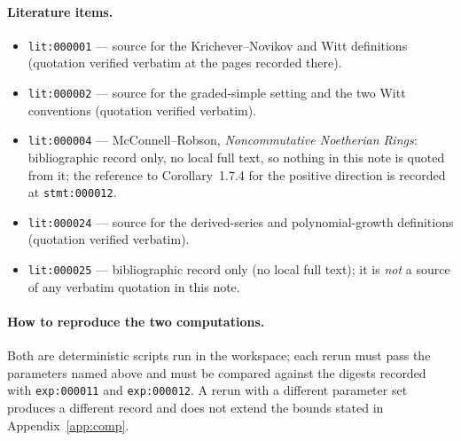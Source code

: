 \documentclass[11pt]{ctexart}
\theoremstyle{plain}
\theoremstyle{definition}
\theoremstyle{remark}
\begin{document}
\paragraph{Literature items.}
\begin{itemize}
\item \texttt{lit:000001} --- source for the Krichever--Novikov and Witt definitions
(quotation verified verbatim at the pages recorded there).
\item \texttt{lit:000002} --- source for the graded-simple setting and the two Witt
conventions (quotation verified verbatim).
\item \texttt{lit:000004} --- McConnell--Robson, \emph{Noncommutative Noetherian
Rings}: bibliographic record only, no local full text, so nothing in this note is
quoted from it; the reference to Corollary~1.7.4 for the positive direction is
recorded at \texttt{stmt:000012}.
\item \texttt{lit:000024} --- source for the derived-series and polynomial-growth
definitions (quotation verified verbatim).
\item \texttt{lit:000025} --- bibliographic record only (no local full text); it is
\emph{not} a source of any verbatim quotation in this note.
\end{itemize}

\paragraph{How to reproduce the two computations.} Both are deterministic scripts run
in the workspace; each rerun must pass the parameters named above and must be compared
against the digests recorded with \texttt{exp:000011} and \texttt{exp:000012}. A rerun
with a different parameter set produces a different record and does not extend the
bounds stated in Appendix~\ref{app:comp}.
\end{document}
